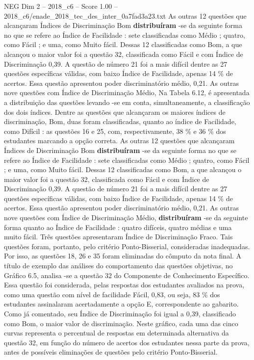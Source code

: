 \begin{textsample}{NEG Dim 2 – 2018\_c6 – Score 1.00 – 2018\_c6/enade\_2018\_tec\_des\_inter\_0a7fad3a23.txt}
As outras 12 questões que alcançaram Índices de Discriminação Bom \textbf{distribuíram} -se da seguinte forma no que se refere ao Índice de Facilidade : sete classificadas como Médio ; quatro, como Fácil ; e uma, como Muito fácil.
Dessas 12 classificadas como Bom, a que alcançou o maior valor foi a questão 32, classificada como Fácil e com Índice de Discriminação 0,39.
A questão de número 21 foi a mais difícil dentre as 27 questões específicas válidas, com baixo Índice de Facilidade, apenas 14 \% de acertos.
Essa questão apresentou poder discriminatório médio, 0,21.
As outras nove questões com Índice de Discriminação Médio, Na Tabela 6.12, é apresentada a distribuição das questões levando -se em conta, simultaneamente, a classificação dos dois índices.
Dentre as questões que alcançaram os maiores índices de discriminação, Bom, duas foram classificadas, quanto ao índice de Facilidade, como Difícil : as questões 16 e 25, com, respectivamente, 38 \% e 36 \% dos estudantes marcando a opção correta.
As outras 12 questões que alcançaram Índices de Discriminação Bom \textbf{distribuíram} -se da seguinte forma no que se refere ao Índice de Facilidade : sete classificadas como Médio ; quatro, como Fácil ; e uma, como Muito fácil.
Dessas 12 classificadas como Bom, a que alcançou o maior valor foi a questão 32, classificada como Fácil e com Índice de Discriminação 0,39.
A questão de número 21 foi a mais difícil dentre as 27 questões específicas válidas, com baixo Índice de Facilidade, apenas 14 \% de acertos.
Essa questão apresentou poder discriminatório médio, 0,21.
As outras nove questões com Índice de Discriminação Médio, \textbf{distribuíram} -se da seguinte forma quanto ao Índice de Facilidade : quatro difíceis, quatro médias e uma muito fácil.
Três questões apresentaram Índice de Discriminação Fraco.
Tais questões foram, portanto, pelo critério Ponto-Bisserial, consideradas inadequadas.
Por isso, as questões 18, 26 e 35 foram eliminadas do cômputo da nota final.
A título de exemplo das análises do comportamento das questões objetivas, no Gráfico 6.5, analisa -se a questão 32 do Componente de Conhecimento Específico.
Essa questão foi considerada, pelas respostas dos estudantes avaliados na prova, como uma questão com nível de facilidade Fácil, 0,83, ou seja, 83 \% dos estudantes assinalaram acertadamente a opção E, correspondente ao gabarito.
Como já comentado, seu Índice de Discriminação foi igual a 0,39, classificado como Bom, o maior valor de discriminação.
Neste gráfico, cada uma das cinco curvas representa o percentual de respostas em determinada alternativa da questão 32, em função do número de acertos dos estudantes nessa parte da prova, antes de possíveis eliminações de questões pelo critério Ponto-Bisserial.

\end{textsample}

